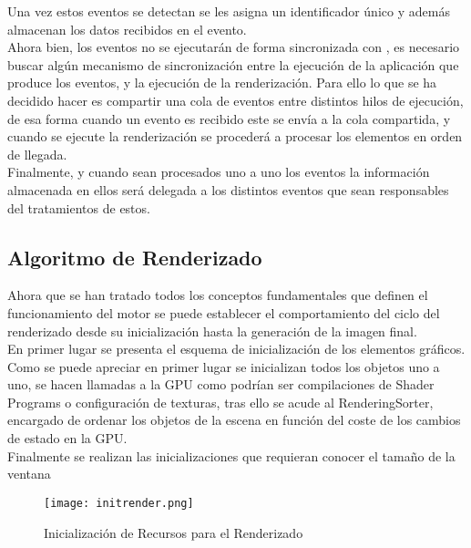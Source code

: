 Una vez estos eventos se detectan se les asigna un identificador único y además almacenan los datos recibidos en el evento.\\

Ahora bien, los eventos no se ejecutarán de forma sincronizada con \robotto, es necesario buscar algún mecanismo de sincronización entre la ejecución de la aplicación que produce los eventos, y la ejecución de la renderización. Para ello lo que se ha decidido hacer es compartir una cola de eventos entre distintos hilos de ejecución, de esa forma cuando un evento es recibido este se envía a la cola compartida, y cuando se ejecute la renderización se procederá a procesar los elementos 
en orden de llegada.\\

Finalmente, y cuando sean procesados uno a uno los eventos la información almacenada en ellos será delegada a los distintos eventos que sean responsables del tratamientos de estos.\\

\subsection{Algoritmo de Renderizado}
Ahora que se han tratado todos los conceptos fundamentales que definen el funcionamiento del motor se puede establecer el comportamiento del ciclo del renderizado desde su inicialización hasta la generación de la imagen final.\\

En primer lugar se presenta el esquema de inicialización de los elementos gráficos.\\
Como se puede apreciar en primer lugar se inicializan todos los objetos uno a uno, se hacen llamadas a la GPU como podrían ser compilaciones de Shader Programs o configuración de texturas,
tras ello se acude al RenderingSorter, encargado de ordenar los objetos de la escena en función del coste de los cambios de estado en la GPU.\\
Finalmente se realizan las inicializaciones que requieran conocer el tamaño de la ventana 

\begin{figure}[h!]
\begin{center}
\texttt{[image: initrender.png]}
\end{center}
\caption[Inicialización de Recursos para el Renderizado]{Inicialización de Recursos para el Renderizado}
\label{fig:initrender}
\end{figure}

